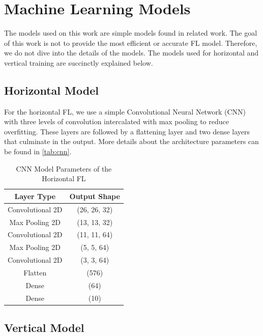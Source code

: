 \section{Machine Learning Models}\label{eval:ml_models}

The models used on this work are simple models found in related work. The goal of this work is not to provide the most efficient or accurate FL model. Therefore, we do not dive into the details of the models. The models used for horizontal and vertical training are succinctly explained below.

\subsection{Horizontal Model}

For the horizontal FL, we use a simple Convolutional Neural Network (CNN) with three levels of convolution intercalated with max pooling to reduce overfitting. These layers are followed by a flattening layer and two dense layers that culminate in the output. More details about the architecture parameters can be found in \autoref{tab:cnn}.

\begin{table}[!h]
    \begin{tabular}{c|c}
        \hline \hline
        Layer Type       & Output Shape \\ \hline \hline
        Convolutional 2D & (26, 26, 32) \\ \hline
        Max Pooling 2D   & (13, 13, 32) \\ \hline
        Convolutional 2D & (11, 11, 64) \\ \hline
        Max Pooling 2D   & (5, 5, 64)   \\ \hline
        Convolutional 2D & (3, 3, 64)   \\ \hline
        Flatten          & (576)        \\ \hline
        Dense            & (64)         \\ \hline
        Dense            & (10)         \\ \hline
    \end{tabular}
    \caption{CNN Model Parameters of the Horizontal FL}
    \label{tab:cnn}
\end{table}

\subsection{Vertical Model}

